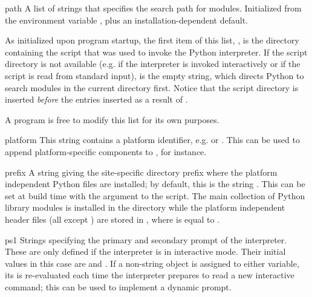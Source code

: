 \begin{datadesc}{path}
  A list of strings that specifies the search path for modules.
  Initialized from the environment variable , plus an
  installation-dependent default.

  As initialized upon program startup,
  the first item of this list, , is the directory
  containing the script that was used to invoke the Python
  interpreter.  If the script directory is not available (e.g.  if the
  interpreter is invoked interactively or if the script is read from
  standard input),  is the empty string, which directs
  Python to search modules in the current directory first.  Notice
  that the script directory is inserted \emph{before} the entries
  inserted as a result of .

  A program is free to modify this list for its own purposes.

\end{datadesc}

\begin{datadesc}{platform}
  This string contains a platform identifier, e.g.  or
  .  This can be used to append platform-specific
  components to , for instance.
\end{datadesc}

\begin{datadesc}{prefix}
  A string giving the site-specific directory prefix where the
  platform independent Python files are installed; by default, this is
  the string .  This can be set at build time with
  the  argument to the 
  script.  The main collection of Python library modules is installed
  in the directory  while
  the platform independent header files (all except )
  are stored in , where
   is equal to .
\end{datadesc}

\begin{datadesc}{ps1}
  Strings specifying the primary and secondary prompt of the
  interpreter.  These are only defined if the interpreter is in
  interactive mode.  Their initial values in this case are
   and .  If a non-string object is
  assigned to either variable, its  is re-evaluated
  each time the interpreter prepares to read a new interactive
  command; this can be used to implement a dynamic prompt.
\end{datadesc}

